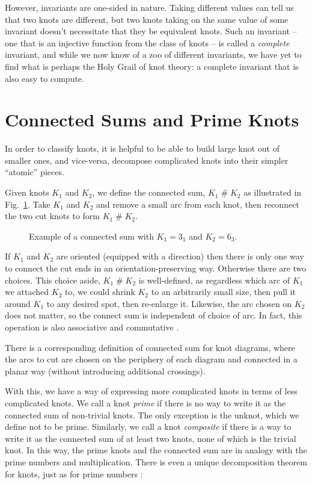 \documentclass[12pt]{report}
\newcommand{\hash}{\ensuremath{\mathbin{\#}}}
\theoremstyle{upright}
\begin{document}
However, invariants are one-sided in nature. Taking different values can tell us that two knots are different, but two knots taking on the same value of some invariant doesn't necessitate that they be equivalent knots. Such an invariant -- one that is an injective function from the class of knots -- is called a \textit{complete} invariant, and while we now know of a zoo of different invariants, we have yet to find what is perhaps the Holy Grail of knot theory: a complete invariant that is also easy to compute.


\section{Connected Sums and Prime Knots}
In order to classify knots, it is helpful to be able to build large knot out of smaller ones, and vice-versa, decompose complicated knots into their simpler ``atomic'' pieces.

Given knots $K_{1}$ and $K_{2}$, we define the connected sum, $K_{1} \hash K_{2}$ as illustrated in Fig.~\ref{fig:connected-sum}. Take $K_{1}$ and $K_{2}$ and remove a small arc from each knot, then reconnect the two cut knots to form $K_{1} \hash K_{2}$.

\begin{figure}[hbt]
	\centering
	\def\svgscale{0.5}
	
	\caption{Example of a connected sum with $K_{1} = 3_{1}$ and $K_{2} = 6_{3}$.}
	\label{fig:connected-sum}
\end{figure}


If $K_{1}$ and $K_{2}$ are oriented (equipped with a direction) then there is only one way to connect the cut ends in an orientation-preserving way. Otherwise there are two choices. This choice aside, $K_{1} \hash K_{2}$ is well-defined, as regardless which arc of $K_{1}$ we attached $K_{2}$ to, we could shrink $K_{2}$ to an arbitrarily small size, then pull it around $K_{1}$ to any desired spot, then re-enlarge it. Likewise, the arc chosen on $K_{2}$ does not matter, so the connect sum is independent of choice of arc. In fact, this operation is also associative and commutative \cite[Corollary 7.13]{knots}.

There is a corresponding definition of connected sum for knot diagrams, where the arcs to cut are chosen on the periphery of each diagram and connected in a planar way (without introducing additional crossings).

With this, we have a way of expressing more complicated knots in terms of less complicated knots. We call a knot \textit{prime} if there is no way to write it as the connected sum of non-trivial knots. The only exception is the unknot, which we define not to be prime.  Similarly, we call a knot \textit{composite} if there is a way to write it as the connected sum of at least two knots, none of which is the trivial knot. In this way, the prime knots and the connected sum are in analogy with the prime numbers and multiplication. There is even a unique decomposition theorem for knots, just as for prime numbers \cite[Thoerem 7.12]{knots}:
\end{document}

